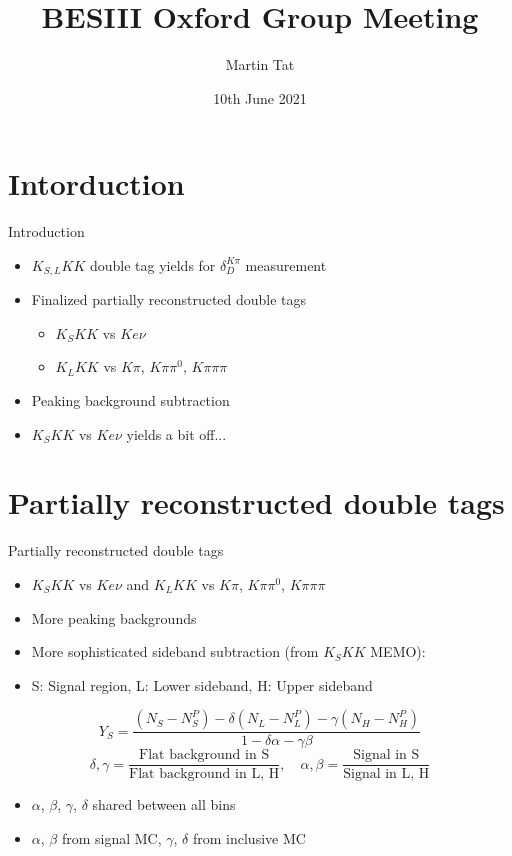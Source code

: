 \documentclass{beamer}
\title[BESIII Oxford]{BESIII Oxford Group Meeting}
\author{Martin Tat}
\institute{Oxford LHCb}
\date{10th June 2021}
\begin{document}
\begin{frame}
  \titlepage
\end{frame}


\section{Intorduction}
\begin{frame}{Introduction}
  \begin{itemize}
    \setlength\itemsep{2em}
    \item{$K_{S, L}KK$ double tag yields for $\delta_D^{K\pi}$ measurement}
    \item{Finalized partially reconstructed double tags}
    \begin{itemize}
      \item{$K_SKK$ vs $Ke\nu$}
      \item{$K_LKK$ vs $K\pi$, $K\pi\pi^0$, $K\pi\pi\pi$}
    \end{itemize}
    \item{Peaking background subtraction}
    \item{$K_SKK$ vs $Ke\nu$ yields a bit off...}
  \end{itemize}
\end{frame}

\section{Partially reconstructed double tags}
\begin{frame}{Partially reconstructed double tags}
  \begin{itemize}
    \setlength\itemsep{1em}
    \item{$K_SKK$ vs $Ke\nu$ and $K_LKK$ vs $K\pi$, $K\pi\pi^0$, $K\pi\pi\pi$}
    \item{More peaking backgrounds}
    \item{More sophisticated sideband subtraction (from $K_SKK$ MEMO):}
    \item{S: Signal region, L: Lower sideband, H: Upper sideband}
  \end{itemize}
  \begin{equation*}
    Y_S = \frac{(N_S - N_S^P) - \delta(N_L - N_L^P) - \gamma(N_H - N_H^P)}{1 - \delta\alpha - \gamma\beta}
  \end{equation*}
  \begin{equation*}
    \delta, \gamma = \frac{\text{Flat background in S}}{\text{Flat background in L, H}}, \quad \alpha, \beta = \frac{\text{Signal in S}}{\text{Signal in L, H}}
  \end{equation*}
  \begin{itemize}
    \item{$\alpha$, $\beta$, $\gamma$, $\delta$ shared between all bins}
    \item{$\alpha$, $\beta$ from signal MC, $\gamma$, $\delta$ from inclusive MC}
  \end{itemize}
\end{frame}
\end{document}
